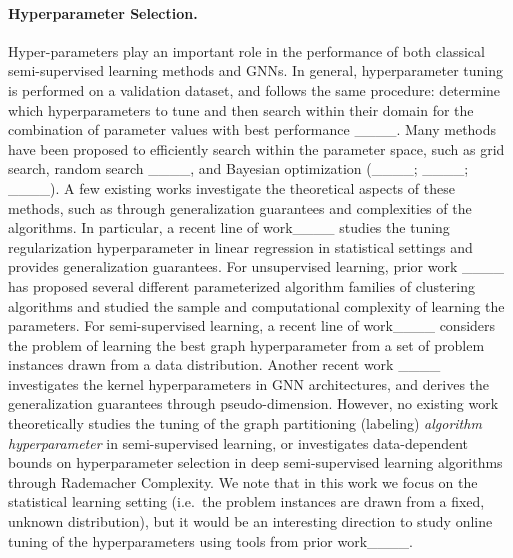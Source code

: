 \paragraph{Hyperparameter Selection.} Hyper-parameters %
play an important role in the performance of both classical semi-supervised learning methods and GNNs. 
In general, hyperparameter tuning is performed on a validation dataset, and follows the same procedure: determine which hyperparameters to tune and then search within their domain for the combination of parameter values with best performance ____. Many methods have been proposed to efficiently search within the parameter space, such as grid search, random search ____, and Bayesian optimization (____; ____; ____). A few existing works investigate the theoretical aspects of these methods, such as through generalization guarantees and complexities of the algorithms. In particular, a recent line of work____ studies the tuning regularization hyperparameter in linear regression in statistical settings and provides generalization guarantees. For unsupervised learning, prior work ____ has proposed several different parameterized algorithm families of clustering algorithms and studied the sample and computational complexity of learning the parameters. For semi-supervised learning, a recent line of work____ considers the problem of learning the best graph hyperparameter from a set of problem instances drawn from a data distribution. Another recent work ____ investigates the kernel hyperparameters in GNN architectures, and derives the generalization guarantees through pseudo-dimension. However, no existing work theoretically studies the tuning of the graph partitioning (labeling) \textit{algorithm hyperparameter} in semi-supervised learning, or investigates data-dependent bounds on hyperparameter selection in deep semi-supervised learning algorithms through Rademacher Complexity. We note that in this work we focus on the statistical learning setting (i.e.\ the problem instances are drawn from a fixed, unknown distribution), but it would be an interesting direction to study online tuning of the hyperparameters using tools from prior work____.